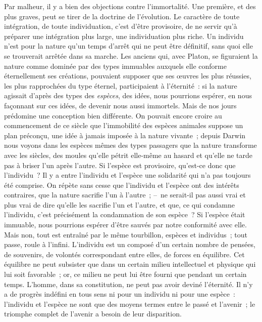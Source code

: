 \documentclass[french,twoside]{book} %
\begin{document}
Par malheur, il y a bien des objections contre l’immortalité. Une première, et des plus graves, peut se tirer de la doctrine de l’évolution. Le caractère de toute intégration, de toute individuation, c’est d’être provisoire, de ne servir qu’à préparer une intégration plus large, une individuation plus riche. Un individu n’est pour la nature qu’un temps d’arrêt qui ne peut être définitif, sans quoi elle se trouverait arrêtée dans sa marche. Les anciens qui, avec Platon, se figuraient la nature comme dominée par des types immuables auxquels elle conforme éternellement ses créations, pouvaient supposer que ses œuvres les plus réussies, les plus rapprochées du type éternel, participaient à l’éternité : si la nature agissait d’après des types des \emph{espèces}, des idées, nous pourrions espérer, en nous façonnant sur ces idées, de devenir nous aussi immortels. Mais de nos jours prédomine une conception bien différente. On pouvait encore croire au commencement de ce siècle que l’immobilité des espèces animales suppose un plan préconçu, une idée à jamais imposée à la nature vivante ; depuis Darwin nous voyons dans les espèces mêmes des types passagers que la nature transforme avec les siècles, des moules qu’elle pétrit elle-même au hasard et qu’elle ne tarde pas à briser l’un après l’autre. Si l’espèce est provisoire, qu’est-ce donc que l’individu ? Il y a entre l’individu et l’espèce une solidarité qui n’a pas toujours été comprise. On répète sans cesse que l’individu et l’espèce ont des intérêts contraires, que la nature sacrifie l’un à l’autre ; – ne serait-il pas aussi vrai et plus vrai de dire qu’elle les sacrifie l’un et l’autre, et que, ce qui condamne l’individu, c’est précisément la condamnation de son espèce ? Si l’espèce était immuable, nous pourrions espérer d’être sauvés par notre conformité avec elle. Mais non, tout est entraîné par le même tourbillon, espèces et individus ; tout passe, roule à l’infini. L’individu est un composé d’un certain nombre de pensées, de souvenirs, de volontés correspondant entre elles, de forces en équilibre. Cet équilibre ne peut subsister que dans un certain milieu intellectuel et physique qui lui soit favorable ; or, ce milieu ne peut lui être fourni que pendant un certain temps. L’homme, dans sa constitution, ne peut pas avoir deviné l’éternité. Il n’y a de progrès indéfini en tous sens ni pour un individu ni pour une espèce : l’individu et l’espèce ne sont que des moyens termes entre le passé et l’avenir ; le triomphe complet de l’avenir a besoin de leur disparition.\par
\end{document}
